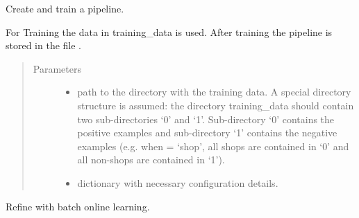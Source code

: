 \documentclass[letterpaper,10pt,english]{sphinxmanual}
\begin{document}
\begin{fulllineitems}
\begin{fulllineitems}
\begin{quote}
\begin{description}
\end{description}\end{quote}

\end{fulllineitems}


\begin{fulllineitems}
\label{\detokenize{api:classifier.Classifier.train}}
Create and train a pipeline.

For Training the data in training\_data is used. After training
the pipeline is stored in the file .
\begin{quote}\begin{description}
\item[{Parameters}] \leavevmode\begin{itemize}
\item {} 
 \textendash{} path to the directory with the training
data. A special directory structure is assumed: the directory
training\_data should contain two sub-directories ‘0’ and
‘1’. Sub-directory ‘0’ contains the positive examples and
sub-directory ‘1’ contains the negative examples (e.g. when
 = ‘shop’, all shops are contained in ‘0’ and all
non-shops are contained in ‘1’).

\item {} 
 \textendash{} dictionary with necessary configuration details.

\end{itemize}

\end{description}\end{quote}

\end{fulllineitems}


\begin{fulllineitems}
\label{\detokenize{api:classifier.Classifier.train_batch}}
Refine  with batch online learning.


\end{fulllineitems}
\end{fulllineitems}
\end{document}
